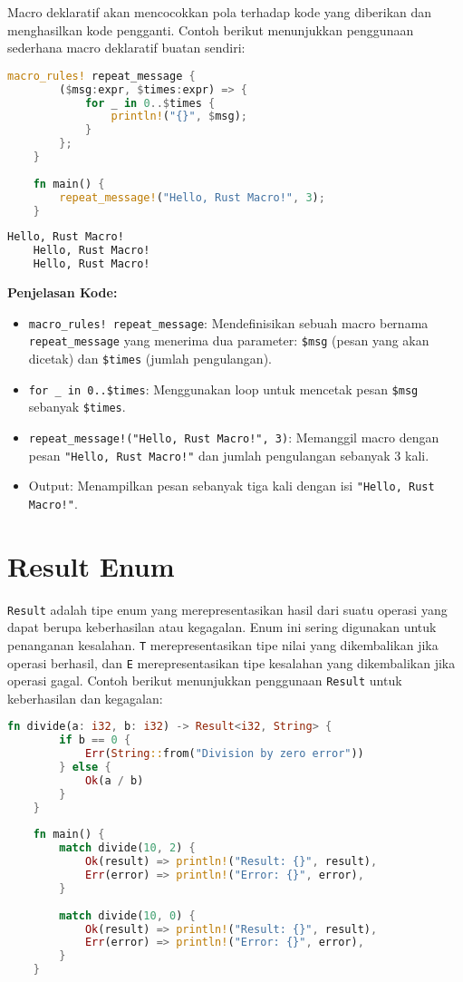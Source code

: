 Macro deklaratif akan mencocokkan pola terhadap kode yang diberikan dan menghasilkan kode pengganti. Contoh berikut menunjukkan penggunaan sederhana macro deklaratif buatan sendiri:

\begin{lstlisting}[language=Rust, caption={Contoh Macro Deklaratif Buatan Sendiri dalam Rust}]
	macro_rules! repeat_message {
		($msg:expr, $times:expr) => {
			for _ in 0..$times {
				println!("{}", $msg);
			}
		};
	}
	
	fn main() {
		repeat_message!("Hello, Rust Macro!", 3);
	}
\end{lstlisting}

\begin{lstlisting}[language=bash, caption={Output Program Macro}]
	Hello, Rust Macro!
	Hello, Rust Macro!
	Hello, Rust Macro!
\end{lstlisting}

\textbf{Penjelasan Kode:}
\begin{itemize}
	\item \texttt{macro\_rules! repeat\_message}: Mendefinisikan sebuah macro bernama \texttt{repeat\_message} yang menerima dua parameter: \texttt{\$msg} (pesan yang akan dicetak) dan \texttt{\$times} (jumlah pengulangan).
	\item \texttt{for \_ in 0..\$times}: Menggunakan loop untuk mencetak pesan \texttt{\$msg} sebanyak \texttt{\$times}.
	\item \texttt{repeat\_message!("Hello, Rust Macro!", 3)}: Memanggil macro dengan pesan \texttt{"Hello, Rust Macro!"} dan jumlah pengulangan sebanyak 3 kali.
	\item Output: Menampilkan pesan sebanyak tiga kali dengan isi \texttt{"Hello, Rust Macro!"}.
\end{itemize}


\section{Result Enum}

\texttt{Result} adalah tipe enum yang merepresentasikan hasil dari suatu operasi yang dapat berupa keberhasilan atau kegagalan. Enum ini sering digunakan untuk penanganan kesalahan. \texttt{T} merepresentasikan tipe nilai yang dikembalikan jika operasi berhasil, dan \texttt{E} merepresentasikan tipe kesalahan yang dikembalikan jika operasi gagal. Contoh berikut menunjukkan penggunaan \texttt{Result} untuk keberhasilan dan kegagalan:

\begin{lstlisting}[language=Rust, caption={Contoh Penggunaan Result Enum dalam Rust}]
	fn divide(a: i32, b: i32) -> Result<i32, String> {
		if b == 0 {
			Err(String::from("Division by zero error"))
		} else {
			Ok(a / b)
		}
	}
	
	fn main() {
		match divide(10, 2) {
			Ok(result) => println!("Result: {}", result),
			Err(error) => println!("Error: {}", error),
		}
		
		match divide(10, 0) {
			Ok(result) => println!("Result: {}", result),
			Err(error) => println!("Error: {}", error),
		}
	}
\end{lstlisting}

